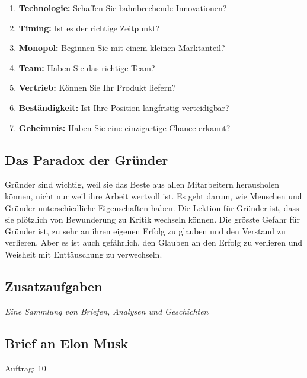 \documentclass[10pt]{article}
\begin{document}
\begin{enumerate}
\item \textbf{Technologie:} Schaffen Sie bahnbrechende Innovationen?
\item \textbf{Timing:} Ist es der richtige Zeitpunkt?
\item \textbf{Monopol:} Beginnen Sie mit einem kleinen Marktanteil?
\item \textbf{Team:} Haben Sie das richtige Team?
\item \textbf{Vertrieb:} Können Sie Ihr Produkt liefern?
\item \textbf{Beständigkeit:} Ist Ihre Position langfristig verteidigbar?
\item \textbf{Geheimnis:} Haben Sie eine einzigartige Chance erkannt?
\end{enumerate}

\subsection{Das Paradox der Gründer}

Gründer sind wichtig, weil sie das Beste aus allen Mitarbeitern herausholen können, nicht nur weil ihre Arbeit wertvoll ist.
Es geht darum, wie Menschen und Gründer unterschiedliche Eigenschaften haben.
Die Lektion für Gründer ist, dass sie plötzlich von Bewunderung zu Kritik wechseln können.
Die grösste Gefahr für Gründer ist, zu sehr an ihren eigenen Erfolg zu glauben und den Verstand zu verlieren. Aber es ist auch gefährlich, den Glauben an den Erfolg zu verlieren und Weisheit mit Enttäuschung zu verwechseln.

\clearpage


\begin{center}
    \section*{Zusatzaufgaben}
    \textit{Eine Sammlung von Briefen, Analysen und Geschichten}
\end{center}

\subsection*{Brief an Elon Musk}

\begin{description}
    \item[Auftrag: 10]
\end{description}
\end{document}
